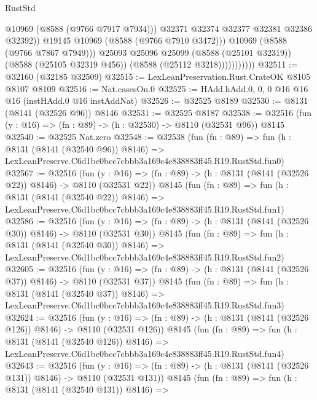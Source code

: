 \begin{lexlean}{RustStd}
\begin{coremodule}
                                @10969
                                (@8588 (@9766 @7917 @7934)))
                              @32371
                              @32374
                              @32377
                              @32381
                              @32386
                              @32392))
                          @19145
                          @10969
                          (@8588 (@9766 @7910 @3472)))
                        @10969
                        (@8588 (@9766 @7867 @7949)))
                      @25093
                      @25096
                      @25099
                      (@8588 (@25101 @32319))
                      (@8588 (@25105 @32319 @456))
                      (@8588 (@25112 @3218)))))))))))
@32511 := @32160 (@32185 @32509)
@32515 := LexLeanPreservation.Rust.CrateOK @8105 @8107 @8109
@32516 := Nat.casesOn.{0}
@32525 := HAdd.hAdd.{0, 0, 0} @16 @16 @16 (instHAdd.{0} @16 instAddNat)
@32526 := @32525 @8189
@32530 := @8131 (@8141 (@32526 @96)) @8146
@32531 := @32525 @8187
@32538 := @32516 (fun (y : @16) => (fn : @89) -> (h : @32530) -> @8110 (@32531 @96)) @8145
@32540 := @32525 Nat.zero
@32548 := @32538
    (fun (fn : @89) =>
    fun (h : @8131 (@8141 (@32540 @96)) @8146) =>
    LexLeanPreserve.C6d1bc0bcc7cbbb3a169c4e838883ff45.R19.RustStd.fun0)
@32567 := @32516
    (fun (y : @16) => (fn : @89) -> (h : @8131 (@8141 (@32526 @22)) @8146) -> @8110 (@32531 @22))
    @8145
    (fun (fn : @89) =>
    fun (h : @8131 (@8141 (@32540 @22)) @8146) =>
    LexLeanPreserve.C6d1bc0bcc7cbbb3a169c4e838883ff45.R19.RustStd.fun1)
@32586 := @32516
    (fun (y : @16) => (fn : @89) -> (h : @8131 (@8141 (@32526 @30)) @8146) -> @8110 (@32531 @30))
    @8145
    (fun (fn : @89) =>
    fun (h : @8131 (@8141 (@32540 @30)) @8146) =>
    LexLeanPreserve.C6d1bc0bcc7cbbb3a169c4e838883ff45.R19.RustStd.fun2)
@32605 := @32516
    (fun (y : @16) => (fn : @89) -> (h : @8131 (@8141 (@32526 @37)) @8146) -> @8110 (@32531 @37))
    @8145
    (fun (fn : @89) =>
    fun (h : @8131 (@8141 (@32540 @37)) @8146) =>
    LexLeanPreserve.C6d1bc0bcc7cbbb3a169c4e838883ff45.R19.RustStd.fun3)
@32624 := @32516
    (fun (y : @16) => (fn : @89) -> (h : @8131 (@8141 (@32526 @126)) @8146) -> @8110 (@32531 @126))
    @8145
    (fun (fn : @89) =>
    fun (h : @8131 (@8141 (@32540 @126)) @8146) =>
    LexLeanPreserve.C6d1bc0bcc7cbbb3a169c4e838883ff45.R19.RustStd.fun4)
@32643 := @32516
    (fun (y : @16) => (fn : @89) -> (h : @8131 (@8141 (@32526 @131)) @8146) -> @8110 (@32531 @131))
    @8145
    (fun (fn : @89) =>
    fun (h : @8131 (@8141 (@32540 @131)) @8146) =>

\end{coremodule}
\end{lexlean}
